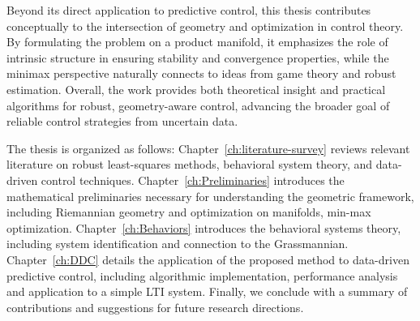 {        Beyond its direct application to predictive control, this thesis contributes conceptually to the intersection of geometry and optimization in control theory. By formulating the problem on a product manifold, it emphasizes the role of intrinsic structure in ensuring stability and convergence properties, while the minimax perspective naturally connects to ideas from game theory and robust estimation. Overall, the work provides both theoretical insight and practical algorithms for robust, geometry-aware control, advancing the broader goal of reliable control strategies from uncertain data.

        The thesis is organized as follows: Chapter~\ref{ch:literature-survey} reviews relevant literature on robust least-squares methods, behavioral system theory, and data-driven control techniques. Chapter~\ref{ch:Preliminaries} introduces the mathematical preliminaries necessary for understanding the geometric framework, including Riemannian geometry and optimization on manifolds, min-max optimization. Chapter~\ref{ch:Behaviors} introduces the behavioral systems theory, including system identification and connection to the Grassmannian. Chapter~\ref{ch:DDC} details the application of the proposed method to data-driven predictive control, including algorithmic implementation, performance analysis and application to a simple LTI system. Finally, we conclude with a summary of contributions and suggestions for future research directions.
}

\newcommand*{\Subject}{%
    Robust Least-Squares Optimization for Data-Driven Predictive Control
}

\newcommand*{\Keywords}{%
    \textcolor{red}{Least-Squares, Data-Driven, Predictive Control, Robust Optimization}
}
\newcommand*{\KeywordsPlaintext}{%
    Least-Squares, Data-Driven, Predictive Control, Robust Optimization
}
